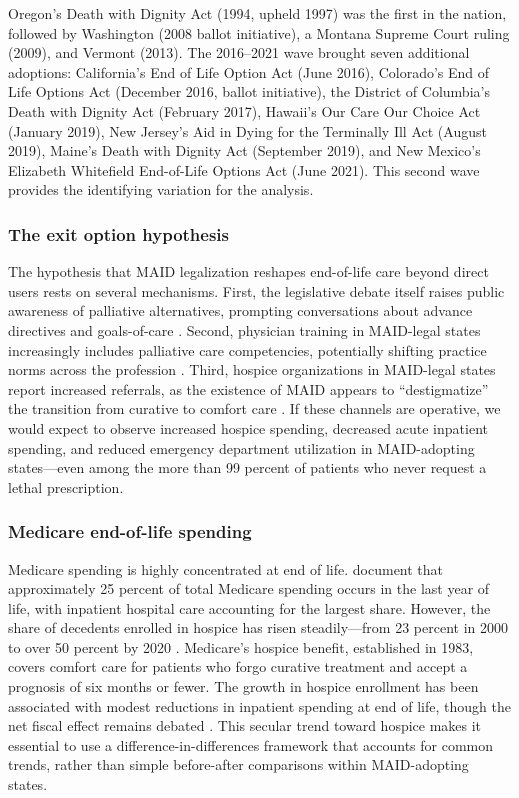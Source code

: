 \documentclass[12pt]{article}
\begin{document}
Oregon's Death with Dignity Act (1994, upheld 1997) was the first in the nation, followed by Washington (2008 ballot initiative), a Montana Supreme Court ruling (2009), and Vermont (2013). The 2016--2021 wave brought seven additional adoptions: California's End of Life Option Act (June 2016), Colorado's End of Life Options Act (December 2016, ballot initiative), the District of Columbia's Death with Dignity Act (February 2017), Hawaii's Our Care Our Choice Act (January 2019), New Jersey's Aid in Dying for the Terminally Ill Act (August 2019), Maine's Death with Dignity Act (September 2019), and New Mexico's Elizabeth Whitefield End-of-Life Options Act (June 2021). This second wave provides the identifying variation for the analysis.

\subsubsection*{The exit option hypothesis}
The hypothesis that MAID legalization reshapes end-of-life care beyond direct users rests on several mechanisms. First, the legislative debate itself raises public awareness of palliative alternatives, prompting conversations about advance directives and goals-of-care \citep{silver2019}. Second, physician training in MAID-legal states increasingly includes palliative care competencies, potentially shifting practice norms across the profession \citep{galushko2015}. Third, hospice organizations in MAID-legal states report increased referrals, as the existence of MAID appears to ``destigmatize'' the transition from curative to comfort care \citep{oha2023}. If these channels are operative, we would expect to observe increased hospice spending, decreased acute inpatient spending, and reduced emergency department utilization in MAID-adopting states---even among the more than 99 percent of patients who never request a lethal prescription.

\subsubsection*{Medicare end-of-life spending}
Medicare spending is highly concentrated at end of life. \citet{riley2010} document that approximately 25 percent of total Medicare spending occurs in the last year of life, with inpatient hospital care accounting for the largest share. However, the share of decedents enrolled in hospice has risen steadily---from 23 percent in 2000 to over 50 percent by 2020 \citep{nhpco2021}. Medicare's hospice benefit, established in 1983, covers comfort care for patients who forgo curative treatment and accept a prognosis of six months or fewer. The growth in hospice enrollment has been associated with modest reductions in inpatient spending at end of life, though the net fiscal effect remains debated \citep{kelley2015}. This secular trend toward hospice makes it essential to use a difference-in-differences framework that accounts for common trends, rather than simple before-after comparisons within MAID-adopting states.
\end{document}
